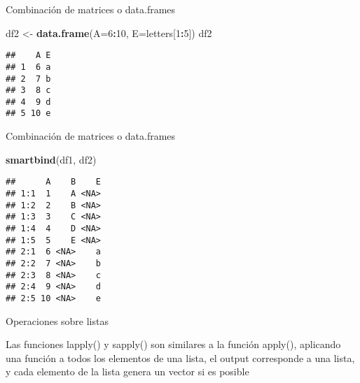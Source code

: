 \documentclass[ignorenonframetext,]{beamer}
\newenvironment{Shaded}{\begin{snugshade}}{\end{snugshade}}
\newcommand{\KeywordTok}[1]{\textcolor[rgb]{0.13,0.29,0.53}{\textbf{#1}}}
\newcommand{\DataTypeTok}[1]{\textcolor[rgb]{0.13,0.29,0.53}{#1}}
\newcommand{\DecValTok}[1]{\textcolor[rgb]{0.00,0.00,0.81}{#1}}
\newcommand{\StringTok}[1]{\textcolor[rgb]{0.31,0.60,0.02}{#1}}
\newcommand{\OperatorTok}[1]{\textcolor[rgb]{0.81,0.36,0.00}{\textbf{#1}}}
\newcommand{\NormalTok}[1]{#1}
\begin{document}
\begin{frame}[fragile]{Combinación de matrices o data.frames}

\begin{Shaded}
\begin{Highlighting}[]
\NormalTok{df2 <-}\StringTok{ }\KeywordTok{data.frame}\NormalTok{(}\DataTypeTok{A=}\DecValTok{6}\OperatorTok{:}\DecValTok{10}\NormalTok{, }\DataTypeTok{E=}\NormalTok{letters[}\DecValTok{1}\OperatorTok{:}\DecValTok{5}\NormalTok{])}
\NormalTok{df2}
\end{Highlighting}
\end{Shaded}

\begin{verbatim}
##    A E
## 1  6 a
## 2  7 b
## 3  8 c
## 4  9 d
## 5 10 e
\end{verbatim}

\end{frame}

\begin{frame}[fragile]{Combinación de matrices o data.frames}

\begin{Shaded}
\begin{Highlighting}[]
\KeywordTok{smartbind}\NormalTok{(df1, df2)}
\end{Highlighting}
\end{Shaded}

\begin{verbatim}
##      A    B    E
## 1:1  1    A <NA>
## 1:2  2    B <NA>
## 1:3  3    C <NA>
## 1:4  4    D <NA>
## 1:5  5    E <NA>
## 2:1  6 <NA>    a
## 2:2  7 <NA>    b
## 2:3  8 <NA>    c
## 2:4  9 <NA>    d
## 2:5 10 <NA>    e
\end{verbatim}

\end{frame}

\begin{frame}{Operaciones sobre listas}

Las funciones lapply() y sapply() son similares a la función apply(),
aplicando una función a todos los elementos de una lista, el output
corresponde a una lista, y cada elemento de la lista genera un vector si
es posible

\end{frame}
\end{document}
